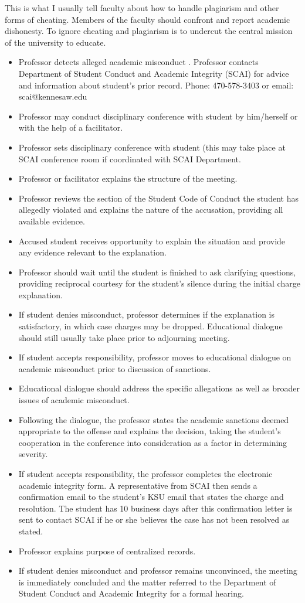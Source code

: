 \documentclass[12pt]{article}
\begin{document}
This is what I usually tell faculty about how to handle plagiarism and other forms of cheating. Members of the faculty should confront and report academic dishonesty. To ignore cheating and plagiarism is to undercut the central mission of the university to educate.
\begin{itemize}
    

\item Professor detects alleged academic misconduct .
Professor contacts Department of Student Conduct and Academic Integrity (SCAI) for advice and information about student’s prior record. Phone: 470-578-3403 or email: scai@kennesaw.edu
\item Professor may conduct disciplinary conference with student by him/herself or with the help of a facilitator.
\item Professor sets disciplinary conference with student (this may take place at SCAI conference room if coordinated with SCAI Department.
\item Professor or facilitator explains the structure of the meeting.
\item Professor reviews the section of the Student Code of Conduct the student has allegedly violated and explains the nature of the accusation, providing all available evidence.
\item Accused student receives opportunity to explain the situation and provide any evidence relevant to the explanation.
 \item Professor should wait until the student is finished to ask clarifying questions, providing reciprocal courtesy for the student’s silence during the initial charge explanation.
\item If student denies misconduct, professor determines if the explanation is satisfactory, in which case charges may be dropped. Educational dialogue should still usually take place prior to adjourning meeting.
\item If student accepts responsibility, professor moves to educational dialogue on academic misconduct prior to discussion of sanctions.
\item Educational dialogue should address the specific allegations as well as broader issues of academic misconduct.
\item Following the dialogue, the professor states the academic sanctions deemed appropriate to the offense and explains the decision, taking the student’s cooperation in the conference into consideration as a factor in determining severity.
\item If student accepts responsibility, the professor completes the electronic academic integrity form. A representative from SCAI then sends a confirmation email to the student's KSU email that states the charge and resolution. The student has 10 business days after this confirmation letter is sent to contact SCAI if he or she believes the case has not been resolved as stated. 
\item Professor explains purpose of centralized records.
\item If student denies misconduct and professor remains unconvinced, the meeting is immediately concluded and the matter referred to the Department of Student Conduct and Academic Integrity for a formal hearing.
\end{itemize}
\end{document}
